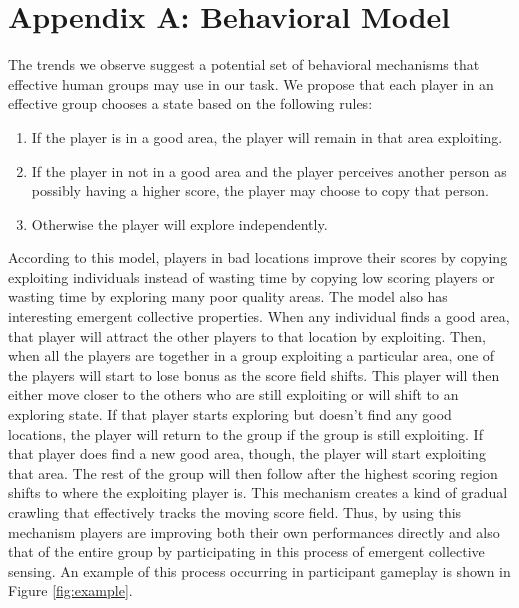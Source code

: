 \documentclass[12pt,letterpaper]{article}
\begin{document}


\setlength{\bibleftmargin}{.125in}
\setlength{\bibindent}{-\bibleftmargin}

\small{
  
}


\section*{Appendix A: Behavioral Model}

The trends we observe suggest a potential set of behavioral mechanisms
that effective human groups may use in our task.  We propose that each
player in an effective group chooses a state based on the following
rules:
\begin{enumerate}
\item
  If the player is in a good area, the player will remain in that area
  exploiting.
\item
  If the player in not in a good area and the player perceives another
  person as possibly having a higher score, the player may choose to
  copy that person.
\item
  Otherwise the player will explore independently.
\end{enumerate}

According to this model, players in bad locations improve their scores
by copying exploiting individuals instead of wasting time by copying
low scoring players or wasting time by exploring many poor quality
areas.  The model also has interesting emergent collective properties.
When any individual finds a good area, that player will attract the
other players to that location by exploiting.  Then, when all the
players are together in a group exploiting a particular area, one of
the players will start to lose bonus as the score field shifts.  This
player will then either move closer to the others who are still
exploiting or will shift to an exploring state.  If that player starts
exploring but doesn't find any good locations, the player will return
to the group if the group is still exploiting.  If that player does
find a new good area, though, the player will start exploiting that
area.  The rest of the group will then follow after the highest
scoring region shifts to where the exploiting player is.  This
mechanism creates a kind of gradual crawling that effectively tracks
the moving score field.  Thus, by using this mechanism players are
improving both their own performances directly and also that of the
entire group by participating in this process of emergent collective
sensing.  An example of this process occurring in participant gameplay
is shown in Figure \ref{fig:example}.
\end{document}
